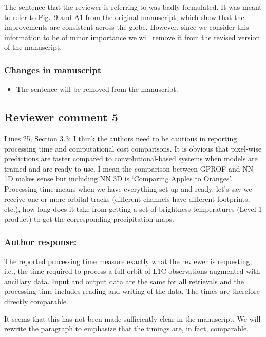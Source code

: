 The sentence that the reviewer is referring to was badly formulated. It was
meant to refer to Fig.~9 and A1 from the original manuscript, which show that
the improvements are consistent across the globe. However, since we consider
this information to be of minor importance we will remove it from the revised
version of the manuscript.

\subsubsection*{Changes in manuscript}

\begin{itemize}
  \item The sentence will be removed from the manuscript.
\end{itemize}

\subsection*{Reviewer comment 5}

Lines 25, Section 3.3: I think the authors need to be cautious in reporting
processing time and computational cost comparisons. It is obvious that
pixel-wise predictions are faster compared to convolutional-based systems when
models are trained and are ready to use. I mean the comparison between GPROF and
NN 1D makes sense but including NN 3D is ‘Comparing Apples to Oranges'.
Processing time means when we have everything set up and ready, let’s say we
receive one or more orbital tracks (different channels have different
footprints, etc.), how long does it take from getting a set of brightness
temperatures (Level 1 product) to get the corresponding precipitation maps.

\subsubsection*{Author response:}

The reported processing time measure exactly what the reviewer is requesting,
i.e., the time required to process a full orbit of L1C observations augmented with
ancillary data. Input and output data are the same for all retrievals and the
processing time includes reading and writing of the data. The times are therefore
directly comparable.

It seems that this has not been made sufficiently clear in the manuscript. We
will rewrite the paragraph to emphasize that the timings are, in fact,
comparable.

